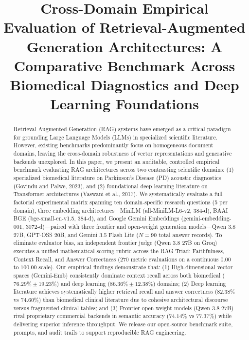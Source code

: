 \documentclass[conference]{IEEEtran}
\begin{document}
\title{Cross-Domain Empirical Evaluation of Retrieval-Augmented Generation Architectures: A Comparative Benchmark Across Biomedical Diagnostics and Deep Learning Foundations}

\author{
}

\maketitle

\begin{abstract}
Retrieval-Augmented Generation (RAG) systems have emerged as a critical paradigm for grounding Large Language Models (LLMs) in specialized scientific literature. However, existing benchmarks predominantly focus on homogeneous document domains, leaving the cross-domain robustness of vector representations and generative backends unexplored. In this paper, we present an auditable, controlled empirical benchmark evaluating RAG architectures across two contrasting scientific domains: (1) specialized biomedical literature on Parkinson's Disease (PD) acoustic diagnostics (Govindu and Palwe, 2023), and (2) foundational deep learning literature on Transformer architectures (Vaswani et al., 2017). We systematically evaluate a full factorial experimental matrix spanning ten domain-specific research questions (5 per domain), three embedding architectures---MiniLM (all-MiniLM-L6-v2, 384-d), BAAI BGE (bge-small-en-v1.5, 384-d), and Google Gemini Embeddings (gemini-embedding-001, 3072-d)---paired with three frontier and open-weight generation models---Qwen 3.8 27B, GPT-OSS 20B, and Gemini 3.5 Flash Lite ($N=90$ total answer records). To eliminate evaluator bias, an independent frontier judge (Qwen 3.8 27B on Groq) executes a unified mathematical scoring rubric across the RAG Triad: Faithfulness, Context Recall, and Answer Correctness (270 metric evaluations on a continuous $0.00$ to $100.00$ scale). Our empirical findings demonstrate that: (1) High-dimensional vector spaces (Gemini-Emb) consistently dominate context recall across both biomedical ($76.29\% \pm 19.23\%$) and deep learning ($86.36\% \pm 12.38\%$) domains; (2) Deep learning literature achieves systematically higher retrieval recall and answer correctness ($82.38\%$ vs $74.60\%$) than biomedical clinical literature due to cohesive architectural discourse versus fragmented clinical tables; and (3) Frontier open-weight models (Qwen 3.8 27B) rival proprietary commercial backends in semantic accuracy ($74.14\%$ vs $77.37\%$) while delivering superior inference throughput. We release our open-source benchmark suite, prompts, and audit trails to support reproducible RAG engineering.
\end{abstract}
\end{document}
